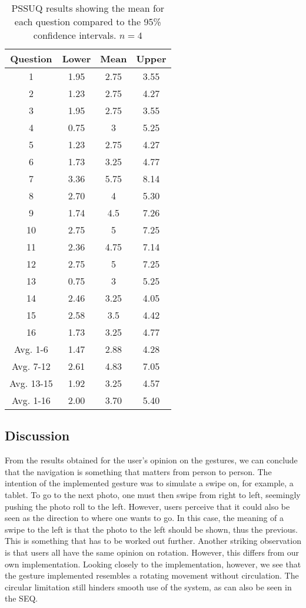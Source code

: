 \documentclass[11pt,a4paper]{article}
\begin{document}
\begin{table}[t!]
\begin{center}
\begin{tabular}{c || c || c | c}
\textbf{Question} &
\textbf{Lower} &
\textbf{Mean} &
\textbf{Upper} \\
\hline
1  & 1.95 & 2.75 & 3.55 \\
2 & 1.23 & 2.75 & 4.27 \\
3 & 1.95 & 2.75 & 3.55\\
4  & 0.75 & 3 & 5.25 \\
5 & 1.23 & 2.75 & 4.27 \\
6 & 1.73 & 3.25 & 4.77 \\
7 & 3.36 & 5.75 & 8.14\\
8 & 2.70 & 4 & 5.30\\
9  & 1.74 & 4.5 & 7.26\\
10 & 2.75 & 5 & 7.25\\
11 & 2.36 & 4.75 & 7.14 \\
12 & 2.75 & 5 & 7.25\\
13 & 0.75 & 3 & 5.25\\
14 & 2.46 & 3.25 & 4.05\\
15 & 2.58 & 3.5 & 4.42\\
16 & 1.73 & 3.25 & 4.77 \\
\hline 
\hline
Avg. 1-6 & 1.47 & 2.88 & 4.28 \\
Avg. 7-12 & 2.61 & 4.83 & 7.05 \\
Avg. 13-15  & 1.92 & 3.25  & 4.57 \\
Avg. 1-16  & 2.00 & 3.70 &  5.40 \\
\end{tabular} 
\caption{PSSUQ results showing the mean for each question compared to the 95\% confidence intervals. $n=4$}
\label{tab:pssuq}
\end{center}
\end{table}

\subsection{Discussion}
From the results obtained for the user's opinion on the gestures, we can conclude that the navigation is something that matters from person to person. The intention of the implemented gesture was to simulate a swipe on, for example, a tablet. To go to the next photo, one must then swipe from right to left, seemingly pushing the photo roll to the left. However, users perceive that it could also be seen as the direction to where one wants to go. In this case, the meaning of a swipe to the left is that the photo to the left should be shown, thus the previous. This is something that has to be worked out further. 
Another striking observation is that users all have the same opinion on rotation. However, this differs from our own implementation. Looking closely to the implementation, however, we see that the gesture implemented resembles a rotating movement without circulation. The circular limitation still hinders smooth use of the system, as can also be seen in the SEQ.
\end{document}
